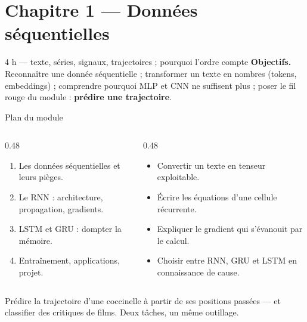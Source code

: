 \section{Chapitre 1 --- Données séquentielles}

%
{4 h --- texte, séries, signaux, trajectoires ; pourquoi l'ordre compte}%
{\textbf{Objectifs.} Reconnaître une donnée séquentielle ; transformer un texte en
nombres (tokens, embeddings) ; comprendre pourquoi MLP et CNN ne suffisent plus ;
poser le fil rouge du module : \textbf{prédire une trajectoire}.}

\begin{frame}{Plan du module}
\begin{columns}[t]
\begin{column}{0.48\textwidth}
\begin{kbox}
\begin{enumerate}
  \item Les données séquentielles et leurs pièges.
  \item Le RNN : architecture, propagation, gradients.
  \item LSTM et GRU : dompter la mémoire.
  \item Entraînement, applications, projet.
\end{enumerate}
\end{kbox}
\end{column}
\begin{column}{0.48\textwidth}
\begin{ebox}
\begin{itemize}
  \item Convertir un texte en tenseur exploitable.
  \item Écrire les équations d'une cellule récurrente.
  \item Expliquer le gradient qui s'évanouit par le calcul.
  \item Choisir entre RNN, GRU et LSTM en connaissance de cause.
\end{itemize}
\end{ebox}
\end{column}
\end{columns}
\vspace{1mm}
\begin{kbox}
Prédire la trajectoire d'une coccinelle à partir de ses positions passées ---
et classifier des critiques de films. Deux tâches, un même outillage.
\end{kbox}
\end{frame}

